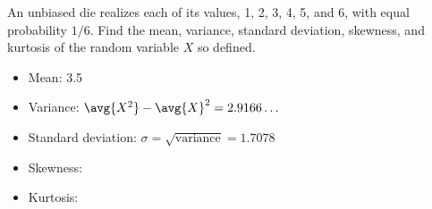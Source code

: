 

An unbiased die realizes each of its values, 1, 2, 3, 4, 5, and 6, with equal probability $1/6$.
Find the mean, variance, standard deviation, skewness, and kurtosis of the random variable $X$ so defined.


\begin{itemize}
  \item{Mean:} 3.5
  \item {Variance:} $\avg{X^2} - \avg{X}^2 = 2.9166\ldots$
  \item{Standard deviation:} $\sigma = \sqrt{\text{variance}} = 1.7078$
  \item{Skewness:}
  \item{Kurtosis:}
\end{itemize}
